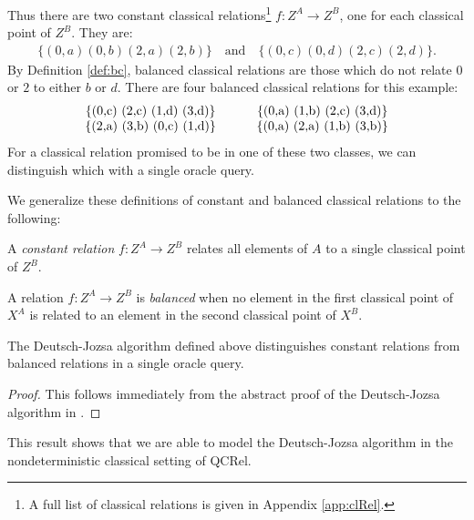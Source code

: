 \begin{example}
Thus there are two constant classical relations\footnote{A full list of classical relations is given in Appendix \ref{app:clRel}.} $f:Z^A\to Z^B$, one for each classical point of $Z^B$. They are:
\begin{align*}
\{ (0,a) (0,b) (2,a) (2,b) \} \quad \mbox{and} \quad
\{ (0,c) (0,d) (2,c) (2,d) \}.
\end{align*}
By Definition \ref{def:bc}, balanced classical relations are those which do not relate $0$ or $2$ to either $b$ or $d$. There are four balanced classical relations for this example:
\begin{align*}
\begin{tabular}{cc}
\{(0,c)   (2,c)   (1,d)   (3,d)\} &\qquad \{(0,a)   (1,b)   (2,c)   (3,d)\} \\
\{(2,a)   (3,b)   (0,c)   (1,d)\} &\qquad \{(0,a)   (2,a)   (1,b)   (3,b)\} \\
\end{tabular}
\end{align*}
For a classical relation promised to be in one of these two classes, we can distinguish which with a single oracle query.
\end{example}

We generalize these definitions of constant and balanced classical relations to the following:
\begin{defn}
\label{def:const}
A \emph{constant relation} $f:Z^{A}\to Z^{B}$ relates all elements of $A$ to a single classical point of $Z^B$.
\end{defn}

\begin{defn}
\label{def:balanced}
A relation $f:Z^{A}\to Z^{B}$ is \emph{balanced} when no element in the first classical point of $X^{A}$ is related to an element in the second classical point of $X^{B}$.
\end{defn}

\begin{theorem}
\label{thm:dj_speedup}
The Deutsch-Jozsa algorithm defined above distinguishes constant relations from balanced relations in a single oracle query.
\end{theorem}
\begin{proof}
This follows immediately from the abstract proof of the Deutsch-Jozsa algorithm in \cite{vicary-tqa}.
\end{proof}

This result shows that we are able to model the Deutsch-Jozsa algorithm in the nondeterministic classical setting of QCRel.

